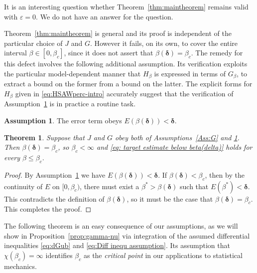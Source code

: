 \documentclass[11pt,a4paper]{article}
\numberwithin{equation}{section}
\theoremstyle{plain}
\newtheorem{Thm}{Theorem}[section]
\theoremstyle{definition}
\newtheorem{Ass}{Assumption}
\newcommand\1{\mathds{1}}
\newcommand{\deltamain}{\boldsymbol{\delta}}
\begin{document}
It is an interesting question whether
Theorem~\ref{thm:maintheorem} remains valid with $\varepsilon=0$.
We do not have an answer for the question.


Theorem~\ref{thm:maintheorem} is general and its proof is independent of
the particular choice of $J$ and $G$.  However it fails, on its own, to
cover the entire interval $\beta \in [0,\beta_c]$, since it does not
assert that $\beta(\deltamain)=\beta_c$.  The remedy for this defect
involves the following additional assumption. Its verification exploits the particular model-dependent manner
that $H_\beta$ is expressed in terms of $G_\beta$, to extract
a bound on the former from a bound on the latter.  The explicit forms for
$H_\beta$ given in \eqref{eq:HSAWperc-intro} accurately suggest that
the verification of Assumption~\ref{Ass:E} is in practice a routine task.

\begin{Ass}
\label{Ass:E}
The error term obeys $E(\beta(\deltamain)) < \deltamain$.
\end{Ass}


\begin{Thm}
\label{thm:maintheorem-betac}
Suppose that $J$ and $G$ obey both of Assumptions~\textup{\ref{Ass:G}} and \textup{\ref{Ass:E}}.
Then $\beta(\deltamain)=\beta_c$, so $\beta_c<\infty$ and
\eqref{eq: target estimate below beta(delta)}
holds for every $\beta\leq \beta_c$.
\end{Thm}

\begin{proof} By Assumption~\ref{Ass:E} we have $E(\beta(\deltamain)) < \deltamain$.
If $\beta(\deltamain)<\beta_c$, then by the continuity of $E$ on $[0,\beta_c)$, there must exist
a $\beta^*>\beta(\deltamain)$ such that $E(\beta^*) < \deltamain$.
This contradicts the definition of $\beta(\deltamain)$, so it must be the case
that $\beta(\deltamain)=\beta_c$.  This completes the proof.
\end{proof}

The following theorem is an easy consequence of our assumptions, as we will show
in Proposition~\ref{prop:gamma-nu} via integration of the assumed differential inequalities
\eqref{eq:dGub} and \eqref{eq:Diff inequ assumption}.
Its assumption that $\chi(\beta_c)=\infty$ identifies $\beta_c$ as the
\emph{critical point} in our applications to statistical mechanics.
\end{document}
